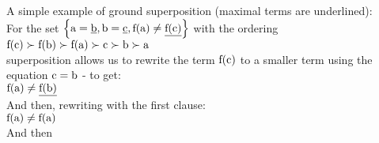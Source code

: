 \bigskip

\noindent
A simple example of ground superposition (maximal terms are underlined):\\
For the set $\left\{\mathrm{a=\underline{b},b=\underline{c},f(a)\neq \underline{f(c)}}\right\}$ with the ordering\\
$\mathrm{f(c)\succ f(b) \succ f(a) \succ c \succ b \succ a}$ \\
superposition allows us to rewrite the term $\mathrm{f(c)}$ to a smaller term using the equation $\mathrm{c=b}$ - to get:\\
$\mathrm{f(a) \neq \underline{f(b)}}$\\
And then, rewriting with the first clause:\\
$\mathrm{f(a) \neq f(a)}$\\
And then\\
\emptyClause

\bigskip

